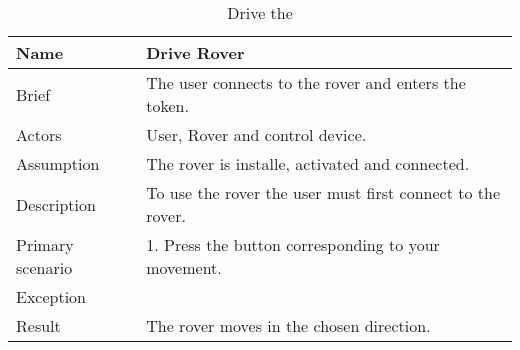 	\begin{table}[htb]
		\centering
		\caption{Drive the }
		\begin{tabular}{|l|l|}
			\hline
			Name             & Drive Rover                                                \\ \hline
			Brief            & The user connects to the rover and enters the token.       \\ \hline
			Actors           & User, Rover and control device.                            \\ \hline
			Assumption       & The rover is installe, activated and connected.            \\ \hline
			Description      & To use the rover the user must first connect to the rover. \\ \hline
			Primary scenario & 1. Press the button corresponding to your movement.        \\ \hline
			Exception        &                                                            \\ \hline
			Result           & The rover moves in the chosen direction.                   \\ \hline
		\end{tabular}
	\end{table}